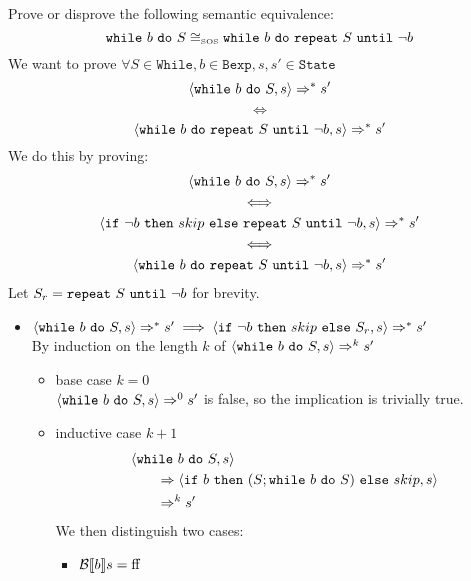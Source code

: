 \begin{exercise}{
    Prove or disprove the following semantic equivalence:
    \[ \texttt{while}\ b\ \texttt{do}\ S \cong_{\text{\tiny SOS}} \texttt{while}\ b\ \texttt{do}\ \texttt{repeat}\ S\ \texttt{until}\ \neg b  \]\vspace*{-0.6cm}
}
    We want to prove $\forall S \in \texttt{While}, b \in \texttt{Bexp}, s, s' \in \texttt{State}$
    \[ \left<\texttt{while}\ b\ \texttt{do}\ S, s\right> \Rightarrow^* s' \]\vspace*{-0.9cm}
    \[ \iff \]\vspace*{-0.7cm}
    \[ \left<\texttt{while}\ b\ \texttt{do}\ \texttt{repeat}\ S\ \texttt{until}\ \neg b, s\right> \Rightarrow^* s' \]
    We do this by proving:
    \begin{gather*}
        \left<\texttt{while}\ b\ \texttt{do}\ S, s\right> \Rightarrow^* s' \\
        \iff \\
        \left<\texttt{if}\ \neg b\ \texttt{then}\ skip\ \texttt{else}\ \texttt{repeat}\ S\ \texttt{until}\ \neg b, s\right> \Rightarrow^* s' \\
        \iff \\
        \left<\texttt{while}\ b\ \texttt{do}\ \texttt{repeat}\ S\ \texttt{until}\ \neg b, s\right> \Rightarrow^* s'
    \end{gather*}
    Let $S_r = \texttt{repeat}\ S\ \texttt{until}\ \neg b$ for brevity.
    \begin{itemize}
        \item $\left<\texttt{while}\ b\ \texttt{do}\ S, s\right> \Rightarrow^* s' \implies \left<\texttt{if}\ \neg b\ \texttt{then}\ skip\ \texttt{else}\ S_r, s\right> \Rightarrow^* s'$ \\
            By induction on the length $k$ of $\left<\texttt{while}\ b\ \texttt{do}\ S, s\right> \Rightarrow^k s'$
            \begin{itemize}
                \item base case $k=0$ \\
                $\left<\texttt{while}\ b\ \texttt{do}\ S, s\right> \Rightarrow^0 s'$ is false, so the implication is trivially true.
                \item inductive case $k+1$ \vspace*{-0.3cm}
                \begin{align*}
                    &\left<\texttt{while}\ b\ \texttt{do}\ S, s\right>
                    \\&\qquad\Rightarrow \left<\texttt{if}\ b\ \texttt{then}\ (S; \texttt{while}\ b\ \texttt{do}\ S)\ \texttt{else}\ skip, s\right>
                    \\&\qquad\Rightarrow^k s'
                \end{align*}
                We then distinguish two cases:
                \begin{itemize}
                    \item $\mathcal{B} \llbracket  b \rrbracket s = \text{ff}$
                    \begin{gather*}

\end{gather*}
\end{itemize}
\end{itemize}
\end{itemize}
\end{exercise}
